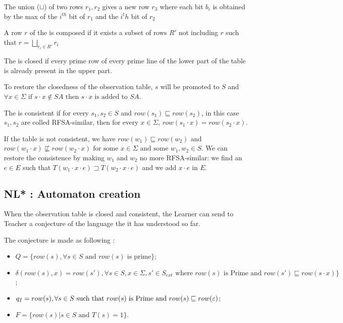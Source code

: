 \begin{definition}
  The union ($\sqcup$) of two rows $r_1, r_2$ gives a new row $r_3$ where each bit $b_i$ is obtained by the max of the $i^{th}$ bit of $r_1$ and the $i^th$ bit of $r_2$
\end{definition}

\begin{definition}
  A row $r$ of the \OT is composed if it exists a subset of rows $R'$ not including $r$ such that $r = \bigsqcup_{r_i \in R'}r_i$
\end{definition}

\begin{definition}[Closedness]
  The \OT is closed if every prime row of every prime line of the lower part of the table is already present in the upper part.
\end{definition}

To restore the closedness of the observation table, $s$ will be promoted to $S$ and $\forall x \in \Sigma \text{ if } s \cdot x \notin SA \text{ then } s \cdot x \text{ is added to } SA$.

\begin{definition}[Consistence]
  The \OT is consistent if for every $s_1,s_2 \in S$ and $row(s_1) \sqsubseteq row(s_2)$, in this case $s_1,s_2$ are colled RFSA-similar, then for every $x \in \Sigma$, $row(s_1 \cdot x) = row(s_2 \cdot x)$.
\end{definition}

If the table is not consistent, we have $row(w_1) \sqsubseteq row(w_2)$ and $row(w_1 \cdot x) \not\sqsubseteq row(w_2 \cdot x) \text{ for some } x \in \Sigma \text{ and some }w_1, w_2 \in S$. We can restore the consistence by making $w_1$ and $w_2$ no more RFSA-similar: we find an $e \in E$ such that $T(w_1 \cdot x \cdot e) \sqsupset T(w_2 \cdot x \cdot e)$ and we add $x \cdot e$ in $E$.

\subsection{NL* : Automaton creation}

When the observation table is closed and consistent, the Learner can send to Teacher a conjecture of the language the it has understood so far.

The conjecture is made as following :
\begin{itemize}
  \item $Q = \{row(s), \forall s \in S \text{ and } row(s) \text{ is  prime} \}$;
  \item $\delta(row(s), x) = row(s'), \forall s \in S, x \in \Sigma, s' \in S_{ext} \text{ where } row(s) \text{ is Prime and } row(s') \sqsubseteq row(s \cdot x)\}$;
  \item $q_I = row(s), \forall s \in S \text{ such that } row(s) \text{ is Prime and } row(s) \sqsubseteq row(\varepsilon) $;
  \item $F = \{row(s) | s \in S \text{ and } T(s) = 1 \}$.
\end{itemize}

